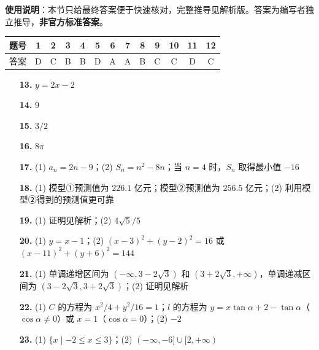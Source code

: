 
\begin{gknotice}
\textbf{使用说明}：本节只给最终答案便于快速核对，完整推导见解析版。答案为编写者独立推导，\textbf{非官方标准答案}。
\end{gknotice}

\begin{center}\begin{tabular}{ccccccccccccc}
\toprule
题号 & 1 & 2 & 3 & 4 & 5 & 6 & 7 & 8 & 9 & 10 & 11 & 12 \\
\midrule
答案 & D & C & B & B & D & A & A & B & C & C & D & C \\
\bottomrule
\end{tabular}\end{center}

\begin{itemize}[leftmargin=2.6em]
  \item[\textbf{13.}] $y=2x-2$
  \item[\textbf{14.}] $9$
  \item[\textbf{15.}] $3/2$
  \item[\textbf{16.}] $8\pi$
\end{itemize}

\begin{itemize}[leftmargin=2.6em]
  \item[\textbf{17.}] (1) $a_n=2n-9$；(2) $S_n=n^2-8n$；当 $n=4$ 时，$S_n$ 取得最小值 $-16$
  \item[\textbf{18.}] (1) 模型①预测值为 $226.1$ 亿元；模型②预测值为 $256.5$ 亿元；(2) 利用模型②得到的预测值更可靠
  \item[\textbf{19.}] (1) 证明见解析；(2) $4\sqrt5/5$
  \item[\textbf{20.}] (1) $y=x-1$；(2) $(x-3)^2+(y-2)^2=16$ 或 $(x-11)^2+(y+6)^2=144$
  \item[\textbf{21.}] (1) 单调递增区间为 $(-\infty, 3-2\sqrt3)$ 和 $(3+2\sqrt3, +\infty)$，单调递减区间为 $(3-2\sqrt3, 3+2\sqrt3)$；(2) 证明见解析
\end{itemize}

\begin{itemize}[leftmargin=2.6em]
  \item[\textbf{22.}] (1) $C$ 的方程为 $x^2/4+y^2/16=1$；$l$ 的方程为 $y=x\tan\alpha+2-\tan\alpha$（$\cos\alpha\ne0$）或 $x=1$（$\cos\alpha=0$）；(2) $-2$
  \item[\textbf{23.}] (1) $\{x\mid -2\leqslant x\leqslant 3\}$；(2) $(-\infty,-6]\cup[2,+\infty)$
\end{itemize}

